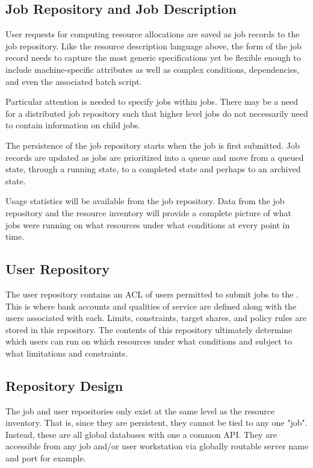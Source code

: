 \subsection{Job Repository and Job Description}
\label{sect:jobdb}

User requests for computing resource allocations are saved as job
records to the job repository.  Like the resource description language
above, the form of the job record needs to capture the most generic
specifications yet be flexible enough to include machine-specific
attributes as well as complex conditions, dependencies, and even the
associated batch script.

Particular attention is needed to specify jobs within jobs.  There may
be a need for a distributed job repository such that higher level jobs
do not necessarily need to contain information on child jobs.

The persistence of the job repository starts when the job is first
submitted.  Job records are updated as jobs are prioritized into a
queue and move from a queued state, through a running state, to a
completed state and perhaps to an archived state.

Usage statistics will be available from the job repository.  Data from
the job repository and the resource inventory will provide a complete
picture of what jobs were running on what resources under what
conditions at every point in time.

\subsection{User Repository}

The user repository contains an ACL of users permitted to submit jobs
to the \ngrm.  This is where bank accounts and qualities of service
are defined along with the users associated with each.  Limits,
constraints, target shares, and policy rules are stored in this
repository.  The contents of this repository ultimately determine
which users can run on which resources under what conditions and
subject to what limitations and constraints.

\subsection{Repository Design}

The job and user repositories only exist at the same level as the
resource inventory. That is, since they are persistent, they cannot be
tied to any one "job". Instead, these are all global databases with
one a common API.  They are accessible from any job and/or user
workstation via globally routable server name and port for example.

